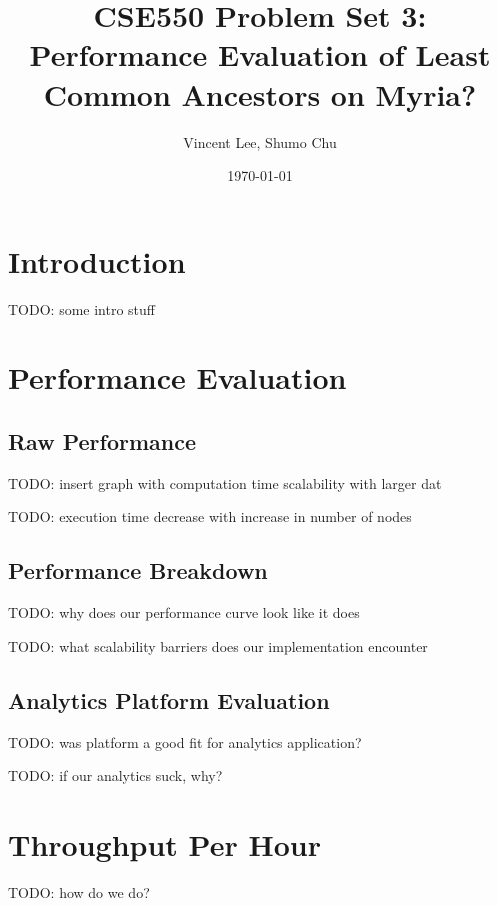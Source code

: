 \documentclass{article}
\begin{document}
\title{CSE550 Problem Set 3: Performance Evaluation of Least Common Ancestors on Myria?}
\author{Vincent Lee, Shumo Chu}
\date{\today}

\maketitle

\tableofcontents


\section{Introduction}

TODO: some intro stuff

\section{Performance Evaluation}

\subsection{Raw Performance}

TODO: insert graph with computation time scalability with larger dat

TODO: execution time decrease with increase in number of nodes

\subsection{Performance Breakdown}

TODO: why does our performance curve look like it does

TODO: what scalability barriers does our implementation encounter

\subsection{Analytics Platform Evaluation}

TODO: was platform a good fit for analytics application?

TODO: if our analytics suck, why?

\section{Throughput Per Hour}

TODO: how do we do?
\end{document}
